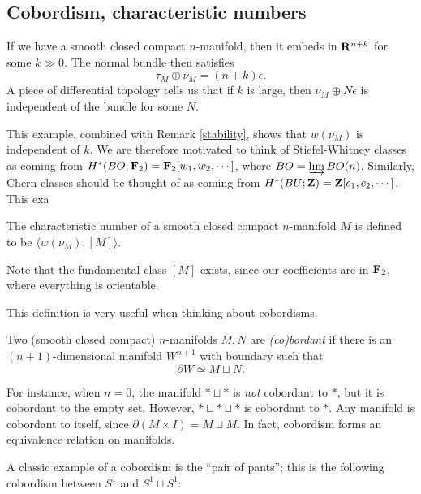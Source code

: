 \subsection{Cobordism, characteristic numbers}
If we have a smooth closed compact $n$-manifold, then it embeds in $\mathbf R^{n+k}$
for some $k\gg 0$. The normal bundle then satisfies
$$\tau_M\oplus \nu_M = (n+k)\epsilon.$$
A piece of differential topology tells us that if $k$ is large, then
$\nu_M\oplus N\epsilon$ is independent of the bundle for some $N$.

This example, combined with Remark \ref{stability}, shows that $w(\nu_M)$ is
independent of $k$. We are therefore motivated to think of Stiefel-Whitney
classes as coming from $H^\ast(BO;\mathbf F_2) = \mathbf F_2[w_1,w_2,\cdots]$, where $BO =
\varinjlim BO(n)$. Similarly, Chern classes should be thought of as coming from
$H^\ast(BU;\mathbf Z) = \mathbf Z[c_1,c_2,\cdots]$. This exa
\begin{definition}
    The characteristic number of a smooth closed compact $n$-manifold
    $M$ is defined to be $\langle w(\nu_M),[M]\rangle$.
\end{definition}
Note that the fundamental class $[M]$ exists, since our coefficients are in
$\mathbf F_2$, where everything is orientable.

This definition is very useful when thinking about cobordisms. 
\begin{definition}\label{cobordism}
    Two (smooth closed compact) $n$-manifolds $M, N$ are \emph{(co)bordant} if
    there is an $(n+1)$-dimensional manifold $W^{n+1}$ with boundary such that
    $$\partial W\simeq M\sqcup N.$$
\end{definition}
For instance, when $n=0$, the manifold $\ast\sqcup \ast$ is \emph{not}
cobordant to $\ast$, but it is cobordant to the empty set. However,
$\ast\sqcup\ast\sqcup\ast$ is cobordant to $\ast$. Any manifold is cobordant
to itself, since $\partial(M\times I) = M\sqcup M$. In fact, cobordism forms
an equivalence relation on manifolds.

\begin{example}
    A classic example of a cobordism is the ``pair of pants''; this is the
    following cobordism between $S^1$ and $S^1\sqcup S^1$:
\end{example}

